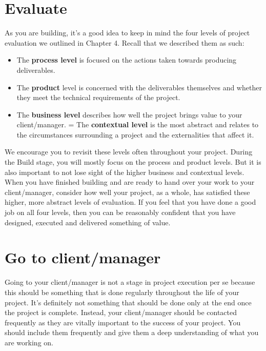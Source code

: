 \documentclass[
]{book}
\providecommand{\tightlist}{%
  \setlength{\itemsep}{0pt}\setlength{\parskip}{0pt}}
\begin{document}
\hypertarget{evaluate}{%
\section{Evaluate}\label{evaluate}}

As you are building, it's a good idea to keep in mind the four levels of
project evaluation we outlined in Chapter 4. Recall that we described
them as such:

\begin{itemize}
\tightlist
\item
  The \textbf{process level} is focused on the actions taken towards
  producing deliverables.
\item
  The \textbf{product} level is concerned with the deliverables
  themselves and whether they meet the technical requirements of the
  project.
\item
  The \textbf{business level} describes how well the project brings
  value to your client/manager. = The \textbf{contextual level} is the
  most abstract and relates to the circumstances surrounding a project
  and the externalities that affect it.
\end{itemize}

We encourage you to revisit these levels often throughout your project.
During the Build stage, you will mostly focus on the process and product
levels. But it is also important to not lose sight of the higher
business and contextual levels. When you have finished building and are
ready to hand over your work to your client/manager, consider how well
your project, as a whole, has satisfied these higher, more abstract
levels of evaluation. If you feel that you have done a good job on all
four levels, then you can be reasonably confident that you have
designed, executed and delivered something of value.

\hypertarget{go-to-clientmanager}{%
\section{Go to client/manager}\label{go-to-clientmanager}}

Going to your client/manager is not a stage in project execution per se
because this should be something that is done regularly throughout the
life of your project. It's definitely not something that should be done
only at the end once the project is complete. Instead, your
client/manager should be contacted frequently as they are vitally
important to the success of your project. You should include them
frequently and give them a deep understanding of what you are working
on.
\end{document}
